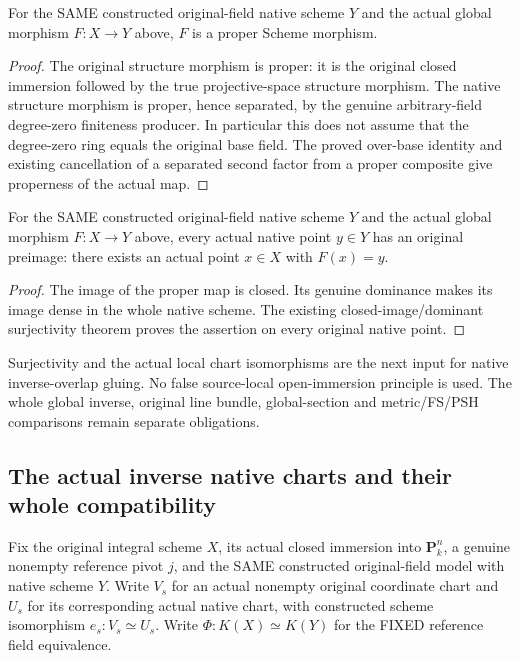 \begin{theorem}
\label{thm:seven-original-native-global-proper-route}
\leanok
{}
For the SAME constructed original-field native scheme $Y$ and the actual
global morphism $F:X\to Y$ above, $F$ is a proper Scheme morphism.
\end{theorem}
\begin{proof}
The original structure morphism is proper: it is the original closed
immersion followed by the true projective-space structure morphism. The
native structure morphism is proper, hence separated, by the genuine
arbitrary-field degree-zero finiteness producer. In particular this does
not assume that the degree-zero ring equals the original base field.
The proved over-base identity and existing cancellation of a separated
second factor from a proper composite give properness of the actual map.
\end{proof}

\begin{theorem}
\label{thm:seven-original-native-global-surjective-route}
\leanok
{}
For the SAME constructed original-field native scheme $Y$ and the actual
global morphism $F:X\to Y$ above, every actual native point $y\in Y$ has
an original preimage: there exists an actual point $x\in X$ with $F(x)=y$.
\end{theorem}
\begin{proof}
The image of the proper map is closed. Its genuine dominance makes its
image dense in the whole native scheme. The existing closed-image/dominant
surjectivity theorem proves the assertion on every original native point.
\end{proof}

Surjectivity and the actual local chart isomorphisms are the next input for
native inverse-overlap gluing. No false source-local open-immersion
principle is used. The whole global inverse, original line bundle,
global-section and metric/FS/PSH comparisons remain separate obligations.

\subsection{The actual inverse native charts and their whole compatibility}
Fix the original integral scheme $X$, its actual closed immersion into
$\mathbf P^n_k$, a genuine nonempty reference pivot $j$, and the SAME
constructed original-field model with native scheme $Y$. Write $V_s$ for
an actual nonempty original coordinate chart and $U_s$ for its corresponding
actual native chart, with constructed scheme isomorphism $e_s:V_s\simeq U_s$.
Write $\Phi:K(X)\simeq K(Y)$ for the FIXED reference field equivalence.

